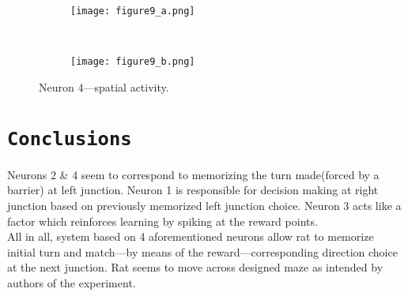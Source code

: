 \documentclass[12pt,a4paper,twocolumn]{article}
\begin{document}
\begin{figure}[htbp]
  \begin{subfigure}{.99\linewidth}\centering
    \texttt{[image: figure9\_a.png]}
    \caption{\label{fig:3d_n4_a}}
  \end{subfigure}\\[1ex]
  \begin{subfigure}{.99\linewidth}\centering
    \texttt{[image: figure9\_b.png]}
    \caption{\label{fig:3d_n4_b}}
  \end{subfigure}

  \caption{Neuron 4---spatial activity.\label{fig:3d_n4}}
\end{figure}

\section*{\texttt{Conclusions}}
Neurons 2 \& 4 seem to correspond to memorizing the turn made(forced by a barrier) at left junction. Neuron 1 is responsible for decision making at right junction based on previously memorized left junction choice. Neuron 3 acts like a factor which reinforces learning by spiking at the reward points.\\
All in all, system based on 4 aforementioned neurons allow rat to memorize initial turn and match---by means of the reward---corresponding direction choice at the next junction. Rat seems to move across designed maze as intended by authors of the experiment.\\
\end{document}
